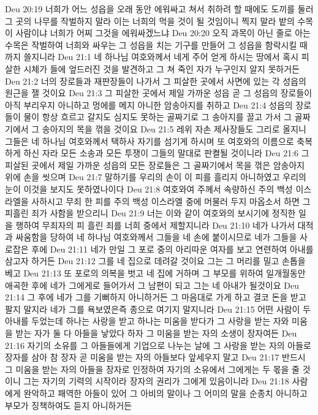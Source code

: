 Deu 20:19  너희가 어느 성읍을 오래 동안 에워싸고 쳐서 취하려 할 때에도 도끼를 둘러 그 곳의 나무를 작벌하지 말라 이는 너희의 먹을 것이 될 것임이니 찍지 말라 밭의 수목이 사람이냐 너희가 어찌 그것을 에워싸겠느냐
Deu 20:20  오직 과목이 아닌 줄로 아는 수목은 작벌하여 너희와 싸우는 그 성읍을 치는 기구를 만들어 그 성읍을 함락시킬 때까지 쓸지니라
Deu 21:1  네 하나님 여호와께서 네게 주어 얻게 하시는 땅에서 혹시 피살한 시체가 들에 엎드러진 것을 발견하고 그 쳐 죽인 자가 누구인지 알지 못하거든
Deu 21:2  너의 장로들과 재판장들이 나가서 그 피살한 곳에서 사면에 있는 각 성읍의 원근을 잴 것이요
Deu 21:3  그 피살한 곳에서 제일 가까운 성읍 곧 그 성읍의 장로들이 아직 부리우지 아니하고 멍에를 메지 아니한 암송아지를 취하고
Deu 21:4  성읍의 장로들이 물이 항상 흐르고 갈지도 심지도 못하는 골짜기로 그 송아지를 끌고 가서 그 골짜기에서 그 송아지의 목을 꺾을 것이요
Deu 21:5  레위 자손 제사장들도 그리로 올지니 그들은 네 하나님 여호와께서 택하사 자기를 섬기게 하시며 또 여호와의 이름으로 축복하게 하신 자라 모든 소송과 모든 투쟁이 그들의 말대로 판켤될 것이니라
Deu 21:6  그 피살된 곳에서 제일 가까운 성읍의 모든 장로들은 그 골짜기에서 목을 꺾은 암송아지 위에 손을 씻으며
Deu 21:7  말하기를 우리의 손이 이 피를 흘리지 아니하였고 우리의 눈이 이것을 보지도 못하였나이다
Deu 21:8  여호와여 주께서 속량하신 주의 백성 이스라엘을 사하시고 무죄 한 피를 주의 백성 이스라엘 중에 머물러 두지 마옵소서 하면 그 피흘린 죄가 사함을 받으리니
Deu 21:9  너는 이와 같이 여호와의 보시기에 정직한 일을 행하여 무죄자의 피 흘린 죄를 너희 중에서 제할지니라
Deu 21:10  네가 나가서 대적과 싸움함을 당하여 네 하나님 여호와께서 그들을 네 손에 붙이시므로 네가 그들을 사로잡은 후에
Deu 21:11  네가 만일 그 포로 중의 아리따운 여자를 보고 연련하여 아내를 삼고자 하거든
Deu 21:12  그를 네 집으로 데려갈 것이요 그는 그 머리를 밀고 손톱을 베고
Deu 21:13  또 포로의 의복을 벗고 네 집에 거하며 그 부모를 위하여 일개월동안 애곡한 후에 네가 그에게로 들어가서 그 남편이 되고 그는 네 아내가 될것이요
Deu 21:14  그 후에 네가 그를 기뻐하지 아니하거든 그 마음대로 가게 하고 결코 돈을 받고 팔지 말지라 네가 그를 욕보였은즉 종으로 여기지 말지니라
Deu 21:15  어떤 사람이 두 아내를 두었는데 하나는 사랑을 받고 하나는 미움을 받다가 그 사랑을 받는 자와 미움을 받는 자가 둘 다 아들을 낳았다 하자 그 미움을 받는 자의 소생이 장자여든
Deu 21:16  자기의 소유를 그 아들들에게 기업으로 나누는 날에 그 사랑을 받는 자의 아들로 장자를 삼아 참 장자 곧 미움을 받는 자의 아들보다 앞세우지 말고
Deu 21:17  반드시 그 미움을 받는 자의 아들을 장자로 인정하여 자기의 소유에서 그에게는 두 몫을 줄 것이니 그는 자기의 기력의 시작이라 장자의 권리가 그에게 있음이니라
Deu 21:18  사람에게 완악하고 패역한 아들이 있어 그 아비의 말이나 그 어미의 말을 순종치 아니하고 부모가 징책하여도 듣지 아니하거든
